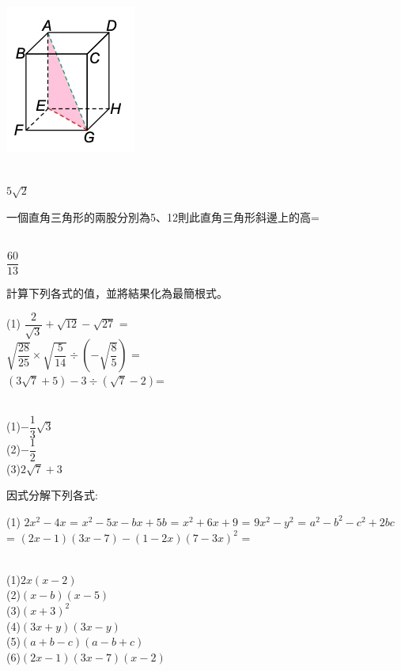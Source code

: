 \documentclass
[answers]
{exam}
\newcommand\ul[1]{\uline{\hspace*{#1}}}
\theoremstyle{definition}
\begin{document}
\begin{questions}
\begin{minipage}[t]{0.7\linewidth}
\end{minipage}
\hfill
\begin{minipage}[t]{0.3\linewidth}
\vspace*{-0.3cm}
\includegraphics[scale=0.5]{./figure/A_2.jpg}
\raggedleft %
\end{minipage}


\begin{solution}~\\
	$5\sqrt{2}$
\end{solution}

\question
一個直角三角形的兩股分別為5、12則此直角三角形斜邊上的高=
\ul{50pt}
\begin{solution}~\\
	$\dfrac{60}{13}$
\end{solution}

\question
計算下列各式的值，並將結果化為最簡根式。
\begin{tasks}(1)
	\task $\dfrac{2}{\sqrt{3}}+\sqrt{12}-\sqrt{27}$ = \ul{50pt}\\
	\task $\sqrt{\dfrac{28}{25}}\times\sqrt{\dfrac{5}{14}}\div\left(-\sqrt{\dfrac{8}{5}}\right)$ = \ul{50pt}\\
	\task $\left(3\sqrt{7}+5\right)-3\div\left(\sqrt{7}-2\right)$= \ul{50pt}\\
\end{tasks}
\begin{solution}~\\
	(1)$-\dfrac{1}{3}\sqrt{3}$\\
	(2)$-\dfrac{1}{2}$\\
	(3)$2\sqrt{7}+3$
\end{solution}

\question
因式分解下列各式:
\begin{tasks}(1)
	\task $2x^2-4x$ = \ul{50pt}
	\task $x^2-5x-bx+5b$ = \ul{50pt}
	\task $x^2+6x+9$ = \ul{50pt}
	\task $9x^2-y^2$ = \ul{50pt}
	\task $a^2-b^2-c^2+2bc$ = \ul{50pt}
	\task $\left(2x-1\right)\left(3x-7\right)-\left(1-2x\right)\left(7-3x\right)^2$ = \ul{50pt}
\end{tasks}
\begin{solution}~\\
	(1)$2x\left(x-2\right)$\\
	(2)$\left(x-b\right)\left(x-5\right)$\\
	(3)$\left(x+3\right)^2$\\
	(4)$\left(3x+y\right)\left(3x-y\right)$\\
	(5)$\left(a+b-c\right)\left(a-b+c\right)$\\
	(6)$\left(2x-1\right)\left(3x-7\right)\left(x-2\right)$
\end{solution}


\end{questions}
\end{document}
